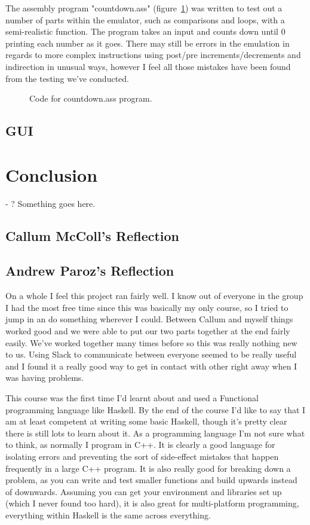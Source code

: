 \documentclass[10point]{article}
\begin{document}
The assembly program "countdown.ass" (figure~\ref{fig:CountdownCode}) was written to test out a number of parts within the emulator, such as comparisons and loops, with a semi-realistic function. The program takes an input and counts down until 0 printing each number as it goes. There may still be errors in the emulation in regards to more complex instructions using post/pre increments/decrements and indirection in unusual ways, however I feel all those mistakes have been found from the testing we've conducted.

\begin{figure}[h]
    \caption{Code for countdown.ass program.}
    \label{fig:CountdownCode}
\end{figure}

\subsection{GUI}

\section{Conclusion}
- ? Something goes here.

\subsection{Callum McColl's Reflection}

\subsection{Andrew Paroz's Reflection}
On a whole I feel this project ran fairly well. I know out of everyone in the group I had the most free time since this was basically my only course, so I tried to jump in an do something wherever I could. Between Callum and myself things worked good and we were able to put our two parts together at the end fairly easily. We've worked together many times before so this was really nothing new to us. Using Slack to communicate between everyone seemed to be really useful and I found it a really good way to get in contact with other right away when I was having problems.

This course was the first time I'd learnt about and used a Functional programming language like Haskell. By the end of the course I'd like to say that I am at least competent at writing some basic Haskell, though it's pretty clear there is still lots to learn about it. As a programming language I'm not sure what to think, as normally I program in C++. It is clearly a good language for isolating errors and preventing the sort of side-effect mistakes that happen frequently in a large C++ program. It is also really good for breaking down a problem, as you can write and test smaller functions and build upwards instead of downwards. Assuming you can get your environment and libraries set up (which I never found too hard), it is also great for multi-platform programming, everything within Haskell is the same across everything.
\end{document}
